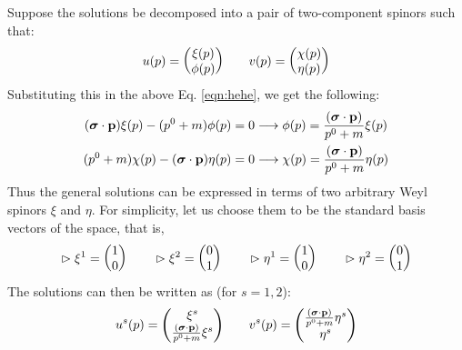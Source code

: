 Suppose the solutions be decomposed into a pair of two-component spinors such that:
$$u(p) = \mqty(\xi(p) \\ \phi(p))\qquad v(p)=\mqty(\chi(p)\\ \eta(p))$$
Substituting this in the above Eq. \ref{eqn:hehe}, we get the following:
\begin{align}\label{eqn:diracmom}
    \begin{split}
    (\boldsymbol{\sigma}\cdot \vb{p})\xi(p) -  ({p^0}+m) \phi(p) &= 0\longrightarrow \phi(p) =\frac{(\boldsymbol{\sigma}\cdot \vb{p})}{{p^0}+m}\xi(p) \\
    ({p^0}+m)\chi(p) - (\boldsymbol{\sigma}\cdot \vb{p})\eta(p)&=0\longrightarrow  \chi(p) = \frac{(\boldsymbol{\sigma}\cdot \vb{p})}{{p^0}+m}\eta(p)
\end{split}
\end{align}
Thus the general solutions can be expressed in terms of two arbitrary Weyl spinors $\xi$ and $\eta$. For simplicity, let us choose them to be the standard basis vectors of the space, that is, 
$$\vartriangleright\xi^1 = \mqty(1\\0)\qquad \vartriangleright\xi^2 = \mqty(0\\1)\qquad \vartriangleright\eta^1 = \mqty(1\\0)\qquad \vartriangleright\eta^2 = \mqty(0\\1)$$
The solutions can then be written as (for $s=1,2$):
$$u^s(p) = \mqty(\xi^s \\ \frac{(\bs{\sigma}\cdot \vb{p})}{{p^0}+m}\xi^s)\qquad v^s(p)=\mqty(\frac{(\bs{\sigma}\cdot \vb{p})}{{p^0}+m}\eta^s\\ \eta^s)$$
